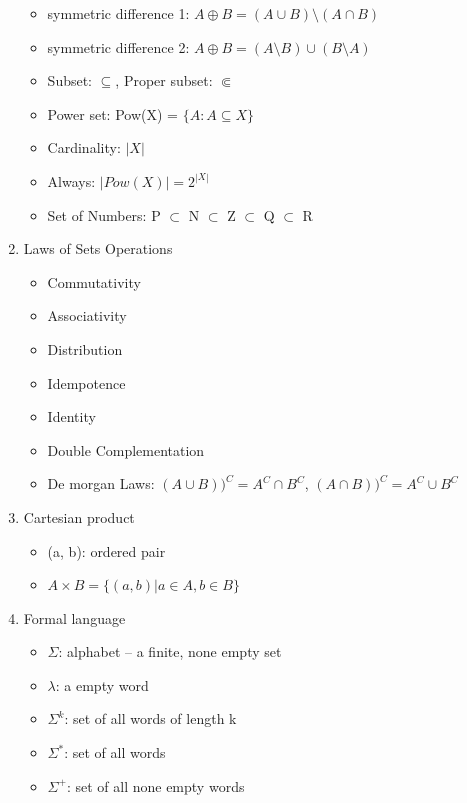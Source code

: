 \documentclass[11pt, a4paper]{article}
\begin{document}
\begin{enumerate}
\begin{itemize}
            \item symmetric difference 1: $A \oplus B = (A \cup B) \setminus (A \cap B)$
            \item symmetric difference 2: $A \oplus B = (A \setminus B) \cup (B \setminus A)$
            \item Subset: $\subseteq$, Proper subset: $\Subset$
            \item Power set: Pow(X) = $\{A: A \subseteq X\}$
            \item Cardinality: $|X|$
            \item Always: $|Pow(X)| = 2^{|X|}$
            \item Set of Numbers: P $\subset$ N $\subset$ Z $\subset$ Q $\subset$ R
        \end{itemize}
    \item Laws of Sets Operations
        \begin{itemize}
            \item Commutativity
            \item Associativity
            \item Distribution
            \item Idempotence
            \item Identity
            \item Double Complementation
            \item De morgan Laws: $(A \cup B))^C = A^C \cap B^C$, $(A \cap B))^C = A^C \cup B^C$
        \end{itemize}
    \item Cartesian product
        \begin{itemize}
            \item (a, b): ordered pair
            \item $A \times B = \{(a,b) | a \in A, b \in B\}$
        \end{itemize}
    \item Formal language
        \begin{itemize}
            \item $\Sigma$: alphabet -- a finite, none empty set
            \item $\lambda$: a empty word
            \item $\Sigma^k$: set of all words of length k
            \item $\Sigma^*$: set of all words
            \item $\Sigma^+$: set of all none empty words
        \end{itemize}
    \end{enumerate}
\end{document}

